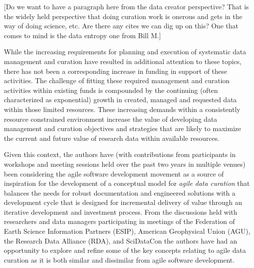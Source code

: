 \documentclass[paper]{ijdc-v9}
\begin{document}
{[}Do we want to have a paragraph here from the data creator
perspective? That is the widely held perspective that doing curation
work is onerous and gets in the way of doing science, etc. Are there any
cites we can dig up on this? One that comes to mind is the data entropy
one from Bill M.{]}

While the increasing requirements for planning and execution of
systematic data management and curation have resulted in additional
attention to these topics, there has not been a corresponding increase
in funding in support of these activities. The challenge of fitting
these required management and curation activities within existing funds
is compounded by the continuing (often characterized as exponential)
growth
\autocites{turner_executive_2016}{national_aeronautics_and_space_administration_nasa_heasarc_2016}
in created, managed and requested data within those limited resources.
These increasing demands within a consistently resource constrained
environment increase the value of developing data management and
curation objectives and strategies that are likely to maximize the
current and future value of research data within available resources.

Given this context, the authors have (with contributions from
participants in workshops and meeting sessions held over the past two
years in multiple venues) been considering the agile software
development movement \autocite{beck_manifesto_2001} as a source of
inspiration for the development of a conceptual model for \emph{agile
data curation} that balances the needs for robust documentation and
engineered solutions with a development cycle that is designed for
incremental delivery of value through an iterative development and
investment process. From the discussions held with researchers and data
managers participating in meetings of the Federation of Earth Science
Information Partners (ESIP), American Geophysical Union (AGU), the
Research Data Alliance (RDA), and SciDataCon the authors have had an
opportunity to explore and refine some of the key concepts relating to
agile data curation as it is both similar and dissimilar from agile
software development.
\end{document}
